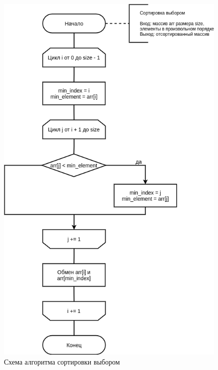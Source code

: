 \begin{figure}[H]
	\begin{center}
		\includegraphics[scale=0.5]{img/selection_sort.png}
	\end{center}
	\captionsetup{justification=centering}
	\caption{Схема алгоритма сортировки выбором}
	\label{img:selection_sort}
\end{figure}

